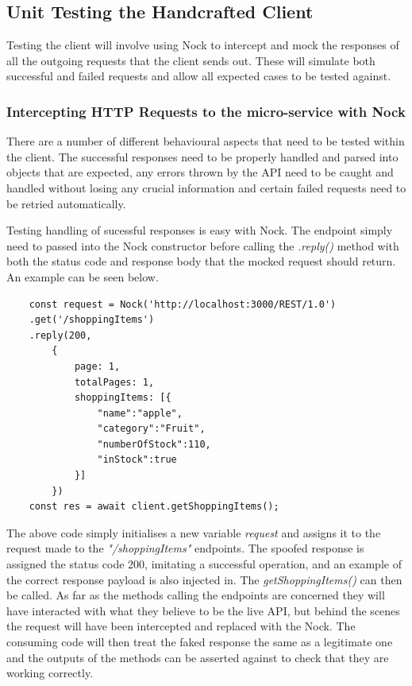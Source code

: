 \subsection{Unit Testing the Handcrafted Client}
Testing the client will involve using Nock to intercept and mock the responses of all the outgoing requests that the client sends out. These will simulate both successful and failed requests and allow all expected cases to be tested against.
\subsubsection{Intercepting HTTP Requests to the micro-service with Nock}
There are a number of different behavioural aspects that need to be tested within the client. The successful responses need to be properly handled and parsed into objects that are expected, any errors thrown by the API need to be caught and handled without losing any crucial information and certain failed requests need to be retried automatically.

Testing handling of sucessful responses is easy with Nock. The endpoint simply need to passed into the Nock constructor before calling the \textit{.reply()} method with both the status code and response body that the mocked request should return. An example can be seen below.
\begin{verbatim}
    const request = Nock('http://localhost:3000/REST/1.0')
    .get('/shoppingItems') 
    .reply(200,
        {
            page: 1,
            totalPages: 1,
            shoppingItems: [{
                "name":"apple",
                "category":"Fruit",
                "numberOfStock":110,
                "inStock":true
            }]
        })
    const res = await client.getShoppingItems();
\end{verbatim}
The above code simply initialises a new variable \textit{request} and assigns it to the request made to the \textit{"/shoppingItems"} endpoints. The spoofed response is assigned the status code 200, imitating a successful operation, and an example of the correct response payload is also injected in. The \textit{getShoppingItems()} can then be called. As far as the methods calling the endpoints are concerned they will have interacted with what they believe to be the live API, but behind the scenes the request will have been intercepted and replaced with the Nock. The consuming code will then treat the faked response the same as a legitimate one and the outputs of the methods can be asserted against to check that they are working correctly.

